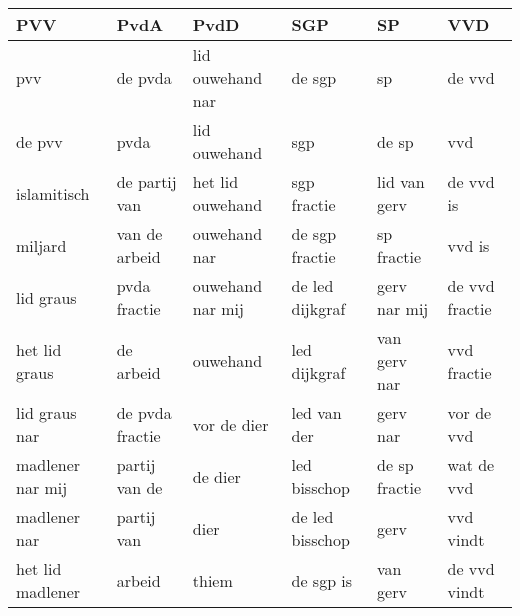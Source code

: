 \begin{tabular}{llllll}
\toprule
              PVV &             PvdA &              PvdD &              SGP &             SP &             VVD \\
\midrule
              pvv &          de pvda &  lid ouwehand nar &           de sgp &             sp &          de vvd \\
           de pvv &             pvda &      lid ouwehand &              sgp &          de sp &             vvd \\
      islamitisch &    de partij van &  het lid ouwehand &      sgp fractie &   lid van gerv &       de vvd is \\
          miljard &    van de arbeid &      ouwehand nar &   de sgp fractie &     sp fractie &          vvd is \\
        lid graus &     pvda fractie &  ouwehand nar mij &  de led dijkgraf &   gerv nar mij &  de vvd fractie \\
    het lid graus &        de arbeid &          ouwehand &     led dijkgraf &   van gerv nar &     vvd fractie \\
    lid graus nar &  de pvda fractie &       vor de dier &      led van der &       gerv nar &      vor de vvd \\
 madlener nar mij &    partij van de &           de dier &     led bisschop &  de sp fractie &      wat de vvd \\
     madlener nar &       partij van &              dier &  de led bisschop &           gerv &       vvd vindt \\
 het lid madlener &           arbeid &             thiem &        de sgp is &       van gerv &    de vvd vindt \\
\bottomrule
\end{tabular}
